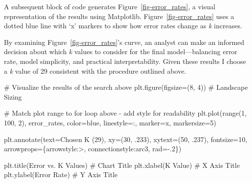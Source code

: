 \documentclass[
]{article}
\newenvironment{Shaded}{\begin{snugshade}}{\end{snugshade}}
\newcommand{\BuiltInTok}[1]{\textcolor[rgb]{0.00,0.23,0.31}{#1}}
\newcommand{\CommentTok}[1]{\textcolor[rgb]{0.37,0.37,0.37}{#1}}
\newcommand{\DecValTok}[1]{\textcolor[rgb]{0.68,0.00,0.00}{#1}}
\newcommand{\FloatTok}[1]{\textcolor[rgb]{0.68,0.00,0.00}{#1}}
\newcommand{\NormalTok}[1]{\textcolor[rgb]{0.00,0.23,0.31}{#1}}
\newcommand{\OperatorTok}[1]{\textcolor[rgb]{0.37,0.37,0.37}{#1}}
\newcommand{\StringTok}[1]{\textcolor[rgb]{0.13,0.47,0.30}{#1}}
\begin{document}
A subsequent block of code generates Figure~\ref{fig-error_rates}, a
visual representation of the results using Matplotlib.
Figure~\ref{fig-error_rates} uses a dotted blue line with `x' markers to
show how error rates change as \emph{k} increases.

By examining Figure~\ref{fig-error_rates}'s curve, an analyst can make
an informed decision about which \emph{k} values to consider for the
final model---balancing error rate, model simplicity, and practical
interpretability. Given these results I choose a \emph{k} value of 29
consistent with the procedure outlined above.

\begin{Shaded}
\begin{Highlighting}[]
\CommentTok{\# Visualize the results of the search above}
\NormalTok{plt.figure(figsize}\OperatorTok{=}\NormalTok{(}\DecValTok{8}\NormalTok{, }\DecValTok{4}\NormalTok{))           }\CommentTok{\# Landscape Sizing}

\CommentTok{\# Match plot range to for loop above {-} add style for readability}
\NormalTok{plt.plot(}\BuiltInTok{range}\NormalTok{(}\DecValTok{1}\NormalTok{, }\DecValTok{100}\NormalTok{, }\DecValTok{2}\NormalTok{), error\_rates, color}\OperatorTok{=}\StringTok{\textquotesingle{}blue\textquotesingle{}}\NormalTok{,}
\NormalTok{         linestyle}\OperatorTok{=}\StringTok{\textquotesingle{}:\textquotesingle{}}\NormalTok{, marker}\OperatorTok{=}\StringTok{\textquotesingle{}x\textquotesingle{}}\NormalTok{, markersize}\OperatorTok{=}\DecValTok{5}\NormalTok{)}

\NormalTok{plt.annotate(text}\OperatorTok{=}\StringTok{\textquotesingle{}Chosen K (29)\textquotesingle{}}\NormalTok{, }
\NormalTok{             xy}\OperatorTok{=}\NormalTok{(}\DecValTok{30}\NormalTok{, }\FloatTok{.233}\NormalTok{), xytext}\OperatorTok{=}\NormalTok{(}\DecValTok{50}\NormalTok{, }\FloatTok{.237}\NormalTok{), fontsize}\OperatorTok{=}\DecValTok{10}\NormalTok{,}
\NormalTok{             arrowprops}\OperatorTok{=}\NormalTok{\{}\StringTok{\textquotesingle{}arrowstyle\textquotesingle{}}\NormalTok{:}\StringTok{\textquotesingle{}{-}\textgreater{}\textquotesingle{}}\NormalTok{, }\StringTok{\textquotesingle{}connectionstyle\textquotesingle{}}\NormalTok{:}\StringTok{\textquotesingle{}arc3, rad={-}.2\textquotesingle{}}\NormalTok{\})}

\NormalTok{plt.title(}\StringTok{\textquotesingle{}Error vs. K Values\textquotesingle{}}\NormalTok{)      }\CommentTok{\# Chart Title}
\NormalTok{plt.xlabel(}\StringTok{\textquotesingle{}K Value\textquotesingle{}}\NormalTok{)                }\CommentTok{\# X Axis Title}
\NormalTok{plt.ylabel(}\StringTok{\textquotesingle{}Error Rate\textquotesingle{}}\NormalTok{)             }\CommentTok{\# Y Axis Title}
\end{Highlighting}
\end{Shaded}
\end{document}
